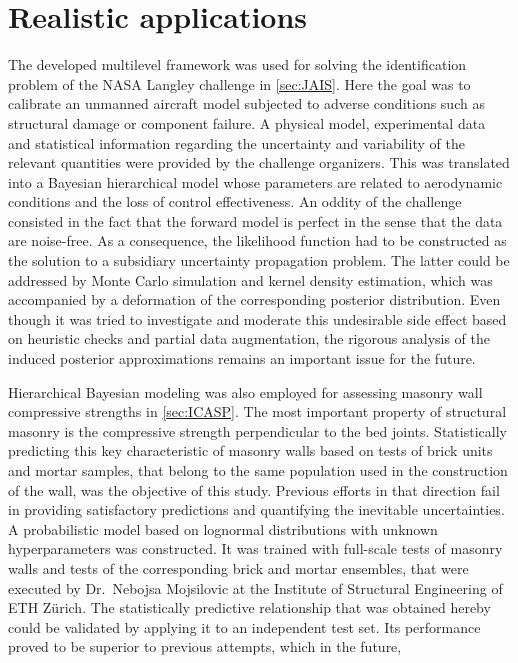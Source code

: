 \section{Realistic applications}
The developed multilevel framework was used for solving the identification problem of the NASA Langley challenge in \cref{sec:JAIS}.
Here the goal was to calibrate an unmanned aircraft model subjected to adverse conditions such as structural damage or component failure.
A physical model, experimental data and statistical information regarding the uncertainty and variability of the relevant quantities were provided by the challenge organizers.
This was translated into a Bayesian hierarchical model whose parameters are related to aerodynamic conditions and the loss of control effectiveness.
An oddity of the challenge consisted in the fact that the forward model is perfect in the sense that the data are noise-free.
As a consequence, the likelihood function had to be constructed as the solution to a subsidiary uncertainty propagation problem.
The latter could be addressed by Monte Carlo simulation and kernel density estimation, which was accompanied by a deformation of the corresponding posterior distribution.
Even though it was tried to investigate and moderate this undesirable side effect based on heuristic checks and partial data augmentation,
the rigorous analysis of the induced posterior approximations remains an important issue for the future.
\par %
Hierarchical Bayesian modeling was also employed for assessing masonry wall compressive strengths in \cref{sec:ICASP}.
The most important property of structural masonry is the compressive strength perpendicular to the bed joints.
Statistically predicting this key characteristic of masonry walls based on tests of brick units and mortar samples,
that belong to the same population used in the construction of the wall, was the objective of this study.
Previous efforts in that direction fail in providing satisfactory predictions and quantifying the inevitable uncertainties.
A probabilistic model based on lognormal distributions with unknown hyperparameters was constructed.
It was trained with full-scale tests of masonry walls and tests of the corresponding brick and mortar ensembles,
that were executed by Dr.\ Nebojsa Mojsilovic at the Institute of Structural Engineering of ETH Z\"{u}rich.
The statistically predictive relationship that was obtained hereby could be validated by applying it to an independent test set.
Its performance proved to be superior to previous attempts, which in the future,

